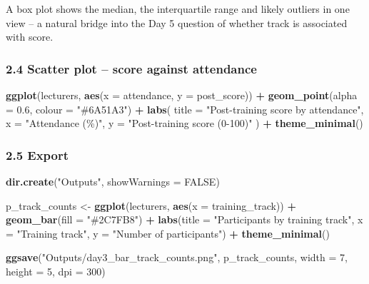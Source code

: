 \documentclass[11pt]{article}
\newenvironment{Shaded}{\begin{snugshade}}{\end{snugshade}}
\newcommand{\AttributeTok}[1]{\textcolor[rgb]{0.13,0.29,0.53}{#1}}
\newcommand{\ConstantTok}[1]{\textcolor[rgb]{0.56,0.35,0.01}{#1}}
\newcommand{\DecValTok}[1]{\textcolor[rgb]{0.00,0.00,0.81}{#1}}
\newcommand{\FloatTok}[1]{\textcolor[rgb]{0.00,0.00,0.81}{#1}}
\newcommand{\FunctionTok}[1]{\textcolor[rgb]{0.13,0.29,0.53}{\textbf{#1}}}
\newcommand{\NormalTok}[1]{#1}
\newcommand{\OtherTok}[1]{\textcolor[rgb]{0.56,0.35,0.01}{#1}}
\newcommand{\SpecialCharTok}[1]{\textcolor[rgb]{0.81,0.36,0.00}{\textbf{#1}}}
\newcommand{\StringTok}[1]{\textcolor[rgb]{0.31,0.60,0.02}{#1}}
\begin{document}
A box plot shows the median, the interquartile range and likely outliers
in one view -- a natural bridge into the Day 5 question of whether track
is associated with score.

\hypertarget{scatter-plot-score-against-attendance}{%
\subsubsection{2.4 Scatter plot -- score against
attendance}\label{scatter-plot-score-against-attendance}}

\begin{Shaded}
\begin{Highlighting}[]
\FunctionTok{ggplot}\NormalTok{(lecturers, }\FunctionTok{aes}\NormalTok{(}\AttributeTok{x =}\NormalTok{ attendance, }\AttributeTok{y =}\NormalTok{ post\_score)) }\SpecialCharTok{+}
  \FunctionTok{geom\_point}\NormalTok{(}\AttributeTok{alpha =} \FloatTok{0.6}\NormalTok{, }\AttributeTok{colour =} \StringTok{"\#6A51A3"}\NormalTok{) }\SpecialCharTok{+}
  \FunctionTok{labs}\NormalTok{(}
    \AttributeTok{title =} \StringTok{"Post{-}training score by attendance"}\NormalTok{,}
    \AttributeTok{x =} \StringTok{"Attendance (\%)"}\NormalTok{, }\AttributeTok{y =} \StringTok{"Post{-}training score (0{-}100)"}
\NormalTok{  ) }\SpecialCharTok{+}
  \FunctionTok{theme\_minimal}\NormalTok{()}
\end{Highlighting}
\end{Shaded}

\hypertarget{export}{%
\subsubsection{2.5 Export}\label{export}}

\begin{Shaded}
\begin{Highlighting}[]
\FunctionTok{dir.create}\NormalTok{(}\StringTok{"Outputs"}\NormalTok{, }\AttributeTok{showWarnings =} \ConstantTok{FALSE}\NormalTok{)}

\NormalTok{p\_track\_counts }\OtherTok{\textless{}{-}} \FunctionTok{ggplot}\NormalTok{(lecturers, }\FunctionTok{aes}\NormalTok{(}\AttributeTok{x =}\NormalTok{ training\_track)) }\SpecialCharTok{+}
  \FunctionTok{geom\_bar}\NormalTok{(}\AttributeTok{fill =} \StringTok{"\#2C7FB8"}\NormalTok{) }\SpecialCharTok{+}
  \FunctionTok{labs}\NormalTok{(}\AttributeTok{title =} \StringTok{"Participants by training track"}\NormalTok{,}
       \AttributeTok{x =} \StringTok{"Training track"}\NormalTok{, }\AttributeTok{y =} \StringTok{"Number of participants"}\NormalTok{) }\SpecialCharTok{+}
  \FunctionTok{theme\_minimal}\NormalTok{()}

\FunctionTok{ggsave}\NormalTok{(}\StringTok{"Outputs/day3\_bar\_track\_counts.png"}\NormalTok{, p\_track\_counts, }\AttributeTok{width =} \DecValTok{7}\NormalTok{, }\AttributeTok{height =} \DecValTok{5}\NormalTok{, }\AttributeTok{dpi =} \DecValTok{300}\NormalTok{)}
\end{Highlighting}
\end{Shaded}
\end{document}

